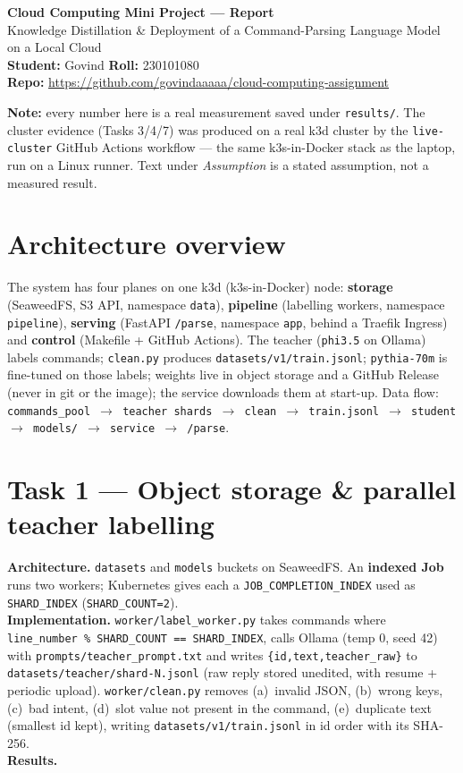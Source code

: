 \documentclass[10pt,a4paper]{article}
\newcommand{\code}[1]{\texttt{\small #1}}
\begin{document}
\begin{center}
  {\LARGE\bfseries Cloud Computing Mini Project --- Report}\\[2pt]
  {\normalsize Knowledge Distillation \& Deployment of a Command-Parsing Language Model on a Local Cloud}\\[6pt]
  \textbf{Student:} Govind \quad\textbf{Roll:} 230101080\\[2pt]
  \textbf{Repo:} \url{https://github.com/govindaaaaa/cloud-computing-assignment}
\end{center}

\noindent\colorbox{gray!12}{\parbox{\dimexpr\textwidth-2\fboxsep\relax}{\small
\textbf{Note:} every number here is a real measurement saved under \code{results/}. The cluster evidence
(Tasks 3/4/7) was produced on a real k3d cluster by the \code{live-cluster} GitHub Actions workflow --- the
same k3s-in-Docker stack as the laptop, run on a Linux runner. Text under \textit{Assumption} is a stated
assumption, not a measured result.}}

\section{Architecture overview}
The system has four planes on one k3d (k3s-in-Docker) node: \textbf{storage} (SeaweedFS, S3 API, namespace
\code{data}), \textbf{pipeline} (labelling workers, namespace \code{pipeline}), \textbf{serving} (FastAPI
\code{/parse}, namespace \code{app}, behind a Traefik Ingress) and \textbf{control} (Makefile + GitHub
Actions). The teacher (\code{phi3.5} on Ollama) labels commands; \code{clean.py} produces
\code{datasets/v1/train.jsonl}; \code{pythia-70m} is fine-tuned on those labels; weights live in object
storage and a GitHub Release (never in git or the image); the service downloads them at start-up. Data flow:
\code{commands\_pool $\rightarrow$ teacher shards $\rightarrow$ clean $\rightarrow$ train.jsonl $\rightarrow$
student $\rightarrow$ models/ $\rightarrow$ service $\rightarrow$ /parse}.

\section{Task 1 --- Object storage \& parallel teacher labelling}
\textbf{Architecture.} \code{datasets} and \code{models} buckets on SeaweedFS. An \textbf{indexed Job} runs
two workers; Kubernetes gives each a \code{JOB\_COMPLETION\_INDEX} used as \code{SHARD\_INDEX}
(\code{SHARD\_COUNT=2}).\\
\textbf{Implementation.} \code{worker/label\_worker.py} takes commands where
\code{line\_number \% SHARD\_COUNT == SHARD\_INDEX}, calls Ollama (temp 0, seed 42) with
\code{prompts/teacher\_prompt.txt} and writes \code{\{id,text,teacher\_raw\}} to
\code{datasets/teacher/shard-N.jsonl} (raw reply stored unedited, with resume + periodic upload).
\code{worker/clean.py} removes (a)~invalid JSON, (b)~wrong keys, (c)~bad intent, (d)~slot value not present
in the command, (e)~duplicate text (smallest id kept), writing \code{datasets/v1/train.jsonl} in id order
with its SHA-256.\\
\textbf{Results.}
\end{document}
